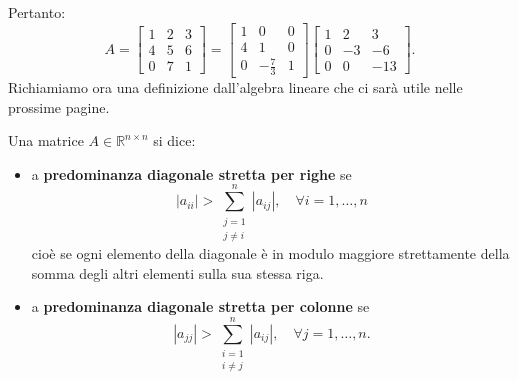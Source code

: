 Pertanto:
\begin{equation*}
A=\begin{bmatrix}
1 & 2 & 3\\
4 & 5 & 6\\
0 & 7 & 1
\end{bmatrix} =\begin{bmatrix}
1 & 0 & 0\\
4 & 1 & 0\\
0 & -\frac{7}{3} & 1
\end{bmatrix}\begin{bmatrix}
1 & 2 & 3\\
0 & -3 & -6\\
0 & 0 & -13
\end{bmatrix}.
\end{equation*}
Richiamiamo ora una definizione dall'algebra lineare che ci sarà utile nelle prossime pagine.
\begin{definition}
  Una matrice $A\in \mathbb{R} ^{n\times n} $ si dice:
  \begin{itemize}
      \item a \textbf{predominanza diagonale stretta per righe} se
      \begin{equation*}
          |a_{ii} | >\sum ^{n}_{\substack{j=1\\j\neq i}} |a_{ij} |,\quad \forall i=1,\dotsc ,n
      \end{equation*}
      cioè se ogni elemento della diagonale è in modulo maggiore strettamente della somma degli altri elementi sulla sua stessa riga.
      \item a \textbf{predominanza diagonale stretta per colonne} se
      \begin{equation*}
          |a_{jj} | >\sum ^{n}_{\substack{i=1\\i\neq j}} |a_{ij} |,\quad \forall j=1,\dotsc ,n.
      \end{equation*}
  \end{itemize}
\end{definition}

